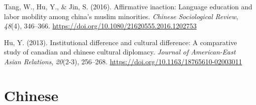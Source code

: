 \documentclass[
  12pt,
]
{article}
\newlength{\cslhangindent}
\newlength{\cslentryspacingunit} %
\newenvironment{CSLReferences}[2] %
 {%
  \setlength{\parindent}{0pt}
  \ifodd #1
  \let\oldpar\par
  \def\par{\hangindent=\cslhangindent\oldpar}
  \fi
  \setlength{\parskip}{#2\cslentryspacingunit}
 }%
 {}
\begin{document}
\begin{CSLReferences}{1}{0}
\leavevmode{}%
Tang, W., Hu, Y., \& Jin, S. (2016). Affirmative inaction: Language
education and labor mobility among china's muslim minorities.
\emph{Chinese Sociological Review}, \emph{48}(4), 346--366.
\url{https://doi.org/10.1080/21620555.2016.1202753}

\leavevmode{}%
Hu, Y. (2013). Institutional difference and cultural difference: A
comparative study of canadian and chinese cultural diplomacy.
\emph{Journal of American-East Asian Relations}, \emph{20}(2-3),
256--268. \url{https://doi.org/10.1163/18765610-02003011}

\end{CSLReferences}

\hypertarget{chinese}{%
\section{Chinese}\label{chinese}}
\end{document}
